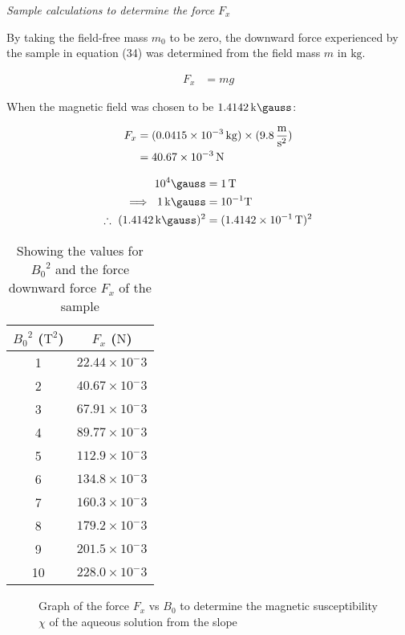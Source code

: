 \documentclass[a4paper,11pt]{article}
\begin{document}
\begin{center}
\textit{Sample calculations to determine the force $F_x$}
\end{center}

By taking the field-free mass $m_0$ to be zero, the downward force experienced by the sample in equation (34) was determined from the field mass $m$ in $\si{\kilogram}$.

\begin{align}
F_x	& = mg\nonumber
\end{align}

When the magnetic field was chosen to be $\SI{1.4142}{\kilo\gauss}$:

\begin{align}
F_x	& = (\SI{0.0415d-3}{\kilogram}) \times (\SI{9.8}{\meter\per\square\second})\nonumber\\
	& = \SI{40.67d-3}{\newton}\nonumber
\end{align} 

\begin{align}
10^4 \si{\gauss}	& = \SI{1}{\tesla}\nonumber\\
\implies~\SI{1}{\kilo\gauss}	& = 10^{-1} \si{\tesla}\nonumber\\
\therefore~(\SI{1.4142}{\kilo\gauss})^2	& = (\SI{1.4142d-1}{\tesla})^2
\end{align}

\begin{table}[ht!]
\centering
\begin{tabular}{|c|c|}
\hline
${B_0}^2$ ($\si{\square\tesla}$)	& $F_x$ ($\si{\newton}$)	\\
\hline
1		& $22.44\times10^-3$	\\
2		& $40.67\times10^-3$	\\
3		& $67.91\times10^-3$	\\
4		& $89.77\times10^-3$	\\
5		& $112.9\times10^-3$	\\
6		& $134.8\times10^-3$	\\
7		& $160.3\times10^-3$	\\
8		& $179.2\times10^-3$	\\
9		& $201.5\times10^-3$	\\
10		& $228.0\times10^-3$	\\
\hline
\end{tabular}
\caption{Showing the values for ${B_0}^2$ and the force downward force $F_x$ of the sample}
\end{table}

\begin{figure}[ht!]
{}
\caption{Graph of the force $F_x$ vs $B_0$ to determine the magnetic susceptibility $\chi$ of the  aqueous solution from the slope}
\label{Fig:5}
\end{figure}
\end{document}
